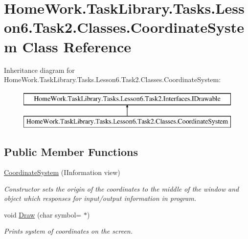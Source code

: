 \hypertarget{class_home_work_1_1_task_library_1_1_tasks_1_1_lesson6_1_1_task2_1_1_classes_1_1_coordinate_system}{}\section{Home\+Work.\+Task\+Library.\+Tasks.\+Lesson6.\+Task2.\+Classes.\+Coordinate\+System Class Reference}
\label{class_home_work_1_1_task_library_1_1_tasks_1_1_lesson6_1_1_task2_1_1_classes_1_1_coordinate_system}
Inheritance diagram for Home\+Work.\+Task\+Library.\+Tasks.\+Lesson6.\+Task2.\+Classes.\+Coordinate\+System\+:\begin{figure}[H]
\begin{center}
\leavevmode
\includegraphics[height=2.000000cm]{class_home_work_1_1_task_library_1_1_tasks_1_1_lesson6_1_1_task2_1_1_classes_1_1_coordinate_system}
\end{center}
\end{figure}
\subsection*{Public Member Functions}
\begin{DoxyCompactItemize}
\item 
\mbox{\hyperlink{class_home_work_1_1_task_library_1_1_tasks_1_1_lesson6_1_1_task2_1_1_classes_1_1_coordinate_system_af8f9967791df2ee81369a906cca23452}{Coordinate\+System}} (I\+Information view)
\begin{DoxyCompactList}\small\item\em Constructor sets the origin of the coordinates to the middle of the window and object which responses for input/output information in program. \end{DoxyCompactList}\item 
void \mbox{\hyperlink{class_home_work_1_1_task_library_1_1_tasks_1_1_lesson6_1_1_task2_1_1_classes_1_1_coordinate_system_a2aed5ec74fa1b6837f9db49afa382dcf}{Draw}} (char symbol=\textquotesingle{} $\ast$\textquotesingle{})
\begin{DoxyCompactList}\small\item\em Prints system of coordinates on the screen. \end{DoxyCompactList}\end{DoxyCompactItemize}
